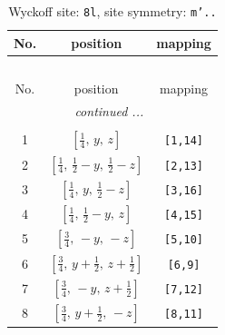 \documentclass[fleqn,8pt]{jsarticle}
\begin{document}
\begin{longtable}{ccc}
\caption{Wyckoff site: {\tt 8l}, site symmetry: {\tt m'..}}
 \\
 \hline \hline
No. & position & mapping \\ \hline \endfirsthead

\multicolumn{2}{l}{\tablename\ \thetable{}} \\
 \hline \hline
No. & position & mapping \\ \hline \endhead

 \hline \hline
\multicolumn{2}{r}{\footnotesize\it continued ...} \\ \endfoot

 \hline \hline
\multicolumn{2}{r}{} \\ \endlastfoot

1 & $\left[ \frac{1}{4},\, y,\, z \right]$ & {\tt [1,14]} \\ \hline
2 & $\left[ \frac{1}{4},\, \frac{1}{2} - y,\, \frac{1}{2} - z \right]$ & {\tt [2,13]} \\ \hline
3 & $\left[ \frac{1}{4},\, y,\, \frac{1}{2} - z \right]$ & {\tt [3,16]} \\ \hline
4 & $\left[ \frac{1}{4},\, \frac{1}{2} - y,\, z \right]$ & {\tt [4,15]} \\ \hline
5 & $\left[ \frac{3}{4},\, - y,\, - z \right]$ & {\tt [5,10]} \\ \hline
6 & $\left[ \frac{3}{4},\, y + \frac{1}{2},\, z + \frac{1}{2} \right]$ & {\tt [6,9]} \\ \hline
7 & $\left[ \frac{3}{4},\, - y,\, z + \frac{1}{2} \right]$ & {\tt [7,12]} \\ \hline
8 & $\left[ \frac{3}{4},\, y + \frac{1}{2},\, - z \right]$ & {\tt [8,11]} \\
\end{longtable}
\renewcommand{\arraystretch}{1.2}
\end{document}
